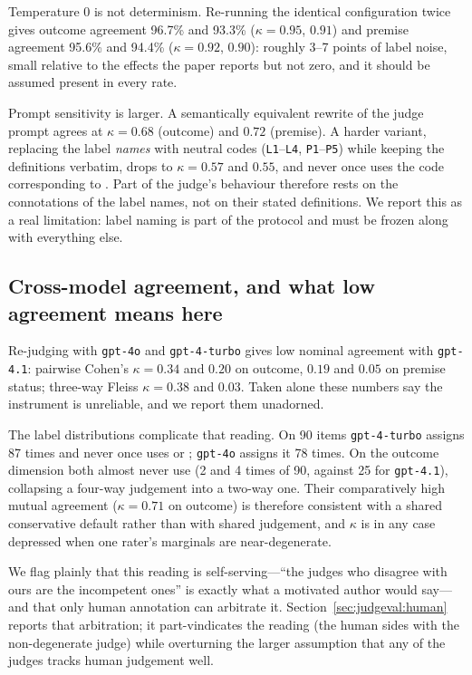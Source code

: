 Temperature 0 is not determinism. Re-running the identical
configuration twice gives outcome agreement 96.7\% and 93.3\%
($\kappa=0.95$, $0.91$) and premise agreement 95.6\% and 94.4\%
($\kappa=0.92$, $0.90$): roughly 3--7 points of label noise, small
relative to the effects the paper reports but not zero, and it should
be assumed present in every rate.

Prompt sensitivity is larger. A semantically equivalent rewrite of the
judge prompt agrees at $\kappa=0.68$ (outcome) and $0.72$ (premise). A
harder variant, replacing the label \emph{names} with neutral codes
(\texttt{L1}--\texttt{L4}, \texttt{P1}--\texttt{P5}) while keeping the
definitions verbatim, drops to $\kappa=0.57$ and $0.55$, and never once
uses the code corresponding to . Part of the
judge's behaviour therefore rests on the connotations of the label
names, not on their stated definitions. We report this as a real
limitation: label naming is part of the protocol and must be frozen
along with everything else.

\subsection{Cross-model agreement, and what low agreement means here}

Re-judging with \texttt{gpt-4o} and \texttt{gpt-4-turbo} gives low
nominal agreement with \texttt{gpt-4.1}: pairwise Cohen's
$\kappa=0.34$ and $0.20$ on outcome, $0.19$ and $0.05$ on premise
status; three-way Fleiss $\kappa=0.38$ and $0.03$. Taken alone these
numbers say the instrument is unreliable, and we report them
unadorned.

The label distributions complicate that reading. On 90 items
\texttt{gpt-4-turbo} assigns  87 times and
never once uses  or ;
\texttt{gpt-4o} assigns it 78 times. On the outcome dimension both
almost never use  (2 and 4 times of 90, against 25
for \texttt{gpt-4.1}), collapsing a four-way judgement into a
two-way one. Their comparatively high mutual agreement
($\kappa=0.71$ on outcome) is therefore consistent with a shared
conservative default rather than with shared judgement, and $\kappa$ is
in any case depressed when one rater's marginals are near-degenerate.

We flag plainly that this reading is self-serving---``the judges who
disagree with ours are the incompetent ones'' is exactly what a
motivated author would say---and that only human annotation can
arbitrate it. Section~\ref{sec:judgeval:human} reports that
arbitration; it part-vindicates the reading (the human sides with the
non-degenerate judge) while overturning the larger assumption that any
of the judges tracks human judgement well.

